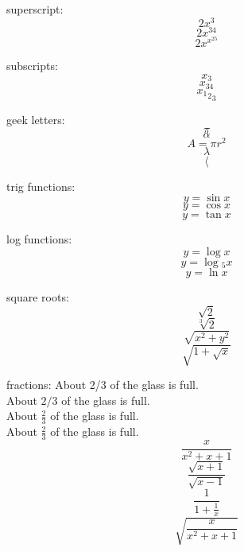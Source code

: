 \documentclass[10pt]{article}
\begin{document}
superscript: $$2x^3$$ 
$$2x^{34}$$
$$ 2x^{x^{25}}$$

subscripts: $$x_3$$
$$x_{34}$$
$${{x_1}_2}_3$$

geek letters:
$$\pi$$
$$\alpha$$
$$A=\pi r^2$$
$$\lambda$$
$$\langle$$

trig functions:
$$y=\sin{x}$$
$$y=\cos{x}$$
$$y=\tan{x}$$

log functions:
$$ y=\log{x}$$
$$ y=\log{_5}{x}$$
$$ y=\ln{x}$$

square roots:
$$\sqrt{2}$$
$$\sqrt[3]{2}$$
$$\sqrt{x^2+y^2}$$
$$\sqrt{1+\sqrt{x}}$$

fractions:
About 2/3 of the glass is full.\\
About $2/3$ of the glass is full.\\
About $\frac{2}{3}$ of the glass is full.\\
About $\displaystyle {\frac{2}{3}}$ of the glass is full.\\

$$\frac{x}{x^2+x+1}$$
$$\frac { \sqrt{x+1} } { \sqrt{x-1} }$$
$$\frac{1}{1+\frac{1}{x}}$$
$$\sqrt{\frac{x}{x^2+x+1}}$$
\end{document}
